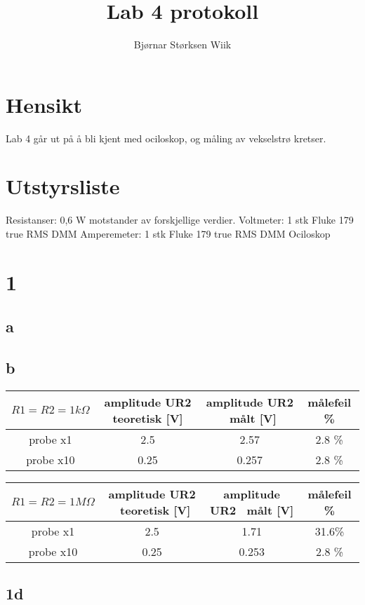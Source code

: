 \documentclass[norsk,10pt,a4paper]{article}
\author{Bjørnar Størksen Wiik}
\title{Lab 4 protokoll}
\begin{document}
	\tableofcontents
	
	\section{Hensikt}
	Lab 4 går ut på å bli kjent med ociloskop, og måling av vekselstrø kretser.
	
	\section{Utstyrsliste}
	Resistanser: 	0,6 W motstander av forskjellige verdier. \newline
	Voltmeter:		1 stk Fluke 179 true RMS DMM	\newline
	Amperemeter:	1 stk Fluke 179 true RMS DMM	\newline
	Ociloskop
	
	\section{1}
	\subsection{a}
	
	\subsection{b}
	\begin{tabular}{|c|c|c|c|}
		\hline 
		$R1=R2=1 k \Omega$  & amplitude UR2 teoretisk [V] & amplitude UR2 \ målt [V] & målefeil \% \\ 
		\hline 
		probe x1 & 2.5 & 2.57 & 2.8 \% \\ 
		\hline 
		probe x10 & 0.25 & 0.257 & 2.8 \% \\ 
		\hline 
	\end{tabular} 
	
	\begin{tabular}{|c|c|c|c|}
		\hline 
		$R1=R2=1 M \Omega$  & amplitude UR2 \ teoretisk [V] & amplitude UR2 \ målt [V] & målefeil \% \\ 
		\hline 
		probe x1 & 2.5 & 1.71 & 31.6\% \\ 
		\hline 
		probe x10 & 0.25 & 0.253 & 2.8 \% \\ 
		\hline 
	\end{tabular} 	
		
	\subsection{1d}
	
\end{document}
